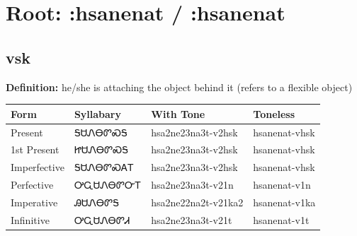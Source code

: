 \documentclass{article}%
\begin{document}
%
\normalsize%
\section*{Root: :hsanenat / :hsanenat}%
\subsection*{vsk}%
\textbf{Definition: }%
he/she is attaching the object behind it (refers to a flexible object)%
\\[0.5em]%
\begin{tabular}{|l|l|l|l|}%
\hline%
\textbf{Form}&\textbf{Syllabary}&\textbf{With Tone}&\textbf{Toneless}\\%
\hline%
Present&ᎦᏌᏁᎾᏛᏍᎦ&hsa2ne23na3t{-}v2hsk&hsanenat{-}vhsk\\%
1st Present&ᏥᏌᏁᎾᏛᏍᎦ&hsa2ne23na3t{-}v2hsk&hsanenat{-}vhsk\\%
Imperfective&ᎦᏌᏁᎾᏛᏍᎪᎢ&hsa2ne23na3t{-}v2hsk&hsanenat{-}vhsk\\%
Perfective&ᎤᏩᏌᏁᎾᏛᏅᎢ&hsa2ne23na3t{-}v21n&hsanenat{-}v1n\\%
Imperative&ᎯᏌᏁᎾᏛᎦ&hsa2ne22na2t{-}v21ka2&hsanenat{-}v1ka\\%
Infinitive&ᎤᏩᏌᏁᎾᏛᏗ&hsa2ne23na3t{-}v21t&hsanenat{-}v1t\\%
\hline%
\end{tabular}%
\\[1em]%
\end{document}
